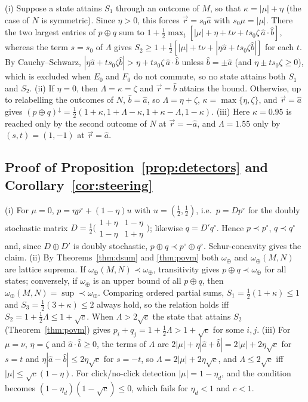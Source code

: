 \documentclass[11pt]{article}
\theoremstyle{definition}
\newcommand{\vecr}{\vec r}
\newcommand{\maj}{\prec}
\newcommand{\omplus}{\omega_{\oplus}}
\newcommand{\sqc}{\sqrt{c}}
\begin{document}
(i) Suppose a state attains $S_1$ through an outcome of $M$, so that $\kappa=|\mu|+\eta$
(the case of $N$ is symmetric). Since $\eta>0$, this forces $\vecr=s_0\hat a$ with
$s_0\mu=|\mu|$. There the two largest entries of $p\oplus q$ sum to
$1+\frac12\max_t[|\mu|+\eta+t\nu+ts_0\zeta\,\hat a\cdot\hat b]$, whereas the term $s=s_0$ of $\Lambda$
gives $S_2\ge1+\frac12[|\mu|+t\nu+|\eta\hat a+ts_0\zeta\hat b|]$ for each $t$. By
Cauchy--Schwarz, $|\eta\hat a+ts_0\zeta\hat b|>\eta+ts_0\zeta\,\hat a\cdot\hat b$ unless $\hat b=\pm\hat a$ (and $\eta\pm ts_0\zeta\ge0$), which is excluded when
$E_0$ and $F_0$ do not commute, so no state attains both $S_1$ and $S_2$.
(ii) If $\eta=0$, then $\Lambda=\kappa=\zeta$ and $\vecr=\hat b$ attains the bound.
Otherwise, up to relabelling the outcomes of $N$, $\hat b=\hat a$, so $\Lambda=\eta+\zeta$,
$\kappa=\max\{\eta,\zeta\}$, and $\vecr=\hat a$ gives
$(p\oplus q)^\downarrow=\frac12(1+\kappa,1+\Lambda-\kappa,1+\kappa-\Lambda,1-\kappa)$. (iii) Here $\kappa=0.95$ is
reached only by the second outcome of $N$ at $\vecr=-\hat a$, and $\Lambda=1.55$ only by
$(s,t)=(1,-1)$ at $\vecr=\hat a$.

\subsection*{Proof of Proposition~\ref{prop:detectors} and Corollary~\ref{cor:steering}}

(i) For $\mu=0$, $p=\eta p^\circ+(1-\eta)u$ with $u=(\frac12,\frac12)$, i.e.\ $p=Dp^\circ$ for the
doubly stochastic matrix $D=\frac12\bigl(\begin{smallmatrix}1+\eta&1-\eta\\1-\eta&1+\eta\end{smallmatrix}\bigr)$;
likewise $q=D'q^\circ$. Hence $p\maj p^\circ$, $q\maj q^\circ$ and, since $D\oplus D'$ is doubly
stochastic, $p\oplus q\maj p^\circ\oplus q^\circ$\cite{MarshallOlkin2011}. Schur-concavity gives the
claim. (ii) By Theorems~\ref{thm:dsum} and \ref{thm:povm} both $\omplus$ and $\omplus(M,N)$
are lattice suprema. If $\omplus(M,N)\maj\omplus$, transitivity gives
$p\oplus q\maj\omplus$ for all states; conversely, if $\omplus$ is an upper bound of all
$p\oplus q$, then $\omplus(M,N)=\sup\maj\omplus$. Comparing ordered partial sums,
$S_1=\frac12(1+\kappa)\le1$ and $S_3=\frac12(3+\kappa)\le2$ always hold, so the relation holds
iff $S_2=1+\frac12\Lambda\le1+\sqc$. When $\Lambda>2\sqc$ the state that attains $S_2$
(Theorem~\ref{thm:povm}) gives $p_i+q_j=1+\frac12\Lambda>1+\sqc$ for some $i,j$.
(iii) For $\mu=\nu$, $\eta=\zeta$ and $\hat a\cdot\hat b\ge0$, the terms of $\Lambda$ are
$2|\mu|+\eta|\hat a+\hat b|=2|\mu|+2\eta\sqc$ for $s=t$ and $\eta|\hat a-\hat b|\le2\eta\sqc$ for $s=-t$,
so $\Lambda=2|\mu|+2\eta\sqc$, and $\Lambda\le2\sqc$ iff $|\mu|\le\sqc(1-\eta)$. For click/no-click
detection $|\mu|=1-\eta_d$, and the condition becomes $(1-\eta_d)(1-\sqc)\le0$, which
fails for $\eta_d<1$ and $c<1$.
\end{document}
